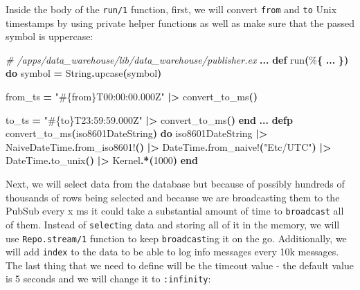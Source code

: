 \documentclass[
  oneside]{book}
\newenvironment{Shaded}{\begin{snugshade}}{\end{snugshade}}
\newcommand{\CommentTok}[1]{\textcolor[rgb]{0.56,0.35,0.01}{\textit{#1}}}
\newcommand{\ConstantTok}[1]{\textcolor[rgb]{0.56,0.35,0.01}{#1}}
\newcommand{\DecValTok}[1]{\textcolor[rgb]{0.00,0.00,0.81}{#1}}
\newcommand{\FunctionTok}[1]{\textcolor[rgb]{0.13,0.29,0.53}{\textbf{#1}}}
\newcommand{\KeywordTok}[1]{\textcolor[rgb]{0.13,0.29,0.53}{\textbf{#1}}}
\newcommand{\NormalTok}[1]{#1}
\newcommand{\OperatorTok}[1]{\textcolor[rgb]{0.81,0.36,0.00}{\textbf{#1}}}
\newcommand{\OtherTok}[1]{\textcolor[rgb]{0.56,0.35,0.01}{#1}}
\newcommand{\StringTok}[1]{\textcolor[rgb]{0.31,0.60,0.02}{#1}}
\begin{document}
\newpage

Inside the body of the \texttt{run/1} function, first, we will convert \texttt{from} and \texttt{to} Unix timestamps by using private helper functions as well as make sure that the passed symbol is uppercase:

\begin{Shaded}
\begin{Highlighting}[]
  \CommentTok{\# /apps/data\_warehouse/lib/data\_warehouse/publisher.ex  }
  \OperatorTok{...}
  \KeywordTok{def}\NormalTok{ run}\FunctionTok{(}\NormalTok{\%}\FunctionTok{\{}
        \OperatorTok{...}
      \FunctionTok{\})} \KeywordTok{do}
\NormalTok{    symbol }\OperatorTok{=} \ConstantTok{String}\OperatorTok{.}\NormalTok{upcase}\FunctionTok{(}\NormalTok{symbol}\FunctionTok{)}

\NormalTok{    from\_ts }\OperatorTok{=}
      \StringTok{"}\OtherTok{\#\{}\NormalTok{from}\OtherTok{\}}\StringTok{T00:00:00.000Z"}
      \OperatorTok{|\textgreater{}}\NormalTok{ convert\_to\_ms}\FunctionTok{()}

\NormalTok{    to\_ts }\OperatorTok{=}
      \StringTok{"}\OtherTok{\#\{}\NormalTok{to}\OtherTok{\}}\StringTok{T23:59:59.000Z"}
      \OperatorTok{|\textgreater{}}\NormalTok{ convert\_to\_ms}\FunctionTok{()}
  \KeywordTok{end}
  \OperatorTok{...}
  \KeywordTok{defp}\NormalTok{ convert\_to\_ms}\FunctionTok{(}\NormalTok{iso8601DateString}\FunctionTok{)} \KeywordTok{do}
\NormalTok{    iso8601DateString}
    \OperatorTok{|\textgreater{}} \ConstantTok{NaiveDateTime}\OperatorTok{.}\NormalTok{from\_iso8601!}\FunctionTok{()}
    \OperatorTok{|\textgreater{}} \ConstantTok{DateTime}\OperatorTok{.}\NormalTok{from\_naive!}\FunctionTok{(}\StringTok{"Etc/UTC"}\FunctionTok{)}
    \OperatorTok{|\textgreater{}} \ConstantTok{DateTime}\OperatorTok{.}\NormalTok{to\_unix}\FunctionTok{()}
    \OperatorTok{|\textgreater{}} \ConstantTok{Kernel}\OperatorTok{.*}\FunctionTok{(}\DecValTok{1000}\FunctionTok{)}
  \KeywordTok{end}
\end{Highlighting}
\end{Shaded}

Next, we will select data from the database but because of possibly hundreds of thousands of rows being selected and because we are broadcasting them to the PubSub every x ms it could take a substantial amount of time to \texttt{broadcast} all of them. Instead of \texttt{select}ing data and storing all of it in the memory, we will use \texttt{Repo.stream/1} function to keep \texttt{broadcast}ing it on the go. Additionally, we will add \texttt{index} to the data to be able to log info messages every 10k messages. The last thing that we need to define will be the timeout value - the default value is 5 seconds and we will change it to \texttt{:infinity}:
\end{document}
